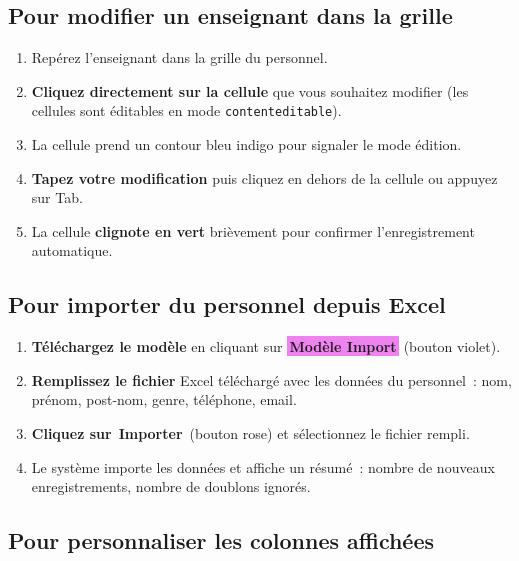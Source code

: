 \documentclass[12pt,a4paper]{report}
\newcommand{\btnviolet}[1]{{\colorbox{violet}{\small\sffamily\bfseries\color{white}\,#1\,}}}
\newcommand{\btnrose}[1]{{\colorbox{rose}{\small\sffamily\bfseries\color{white}\,#1\,}}}
\begin{document}
\subsection{Pour modifier un enseignant dans la grille}

\begin{etape}[title=Proc\'edure : Modification inline]
\begin{enumerate}[leftmargin=1.5cm,label=\textbf{\arabic*.},itemsep=8pt]
  \item Rep\'erez l'enseignant dans la grille du personnel.
  \item \textbf{Cliquez directement sur la cellule} que vous souhaitez modifier (les cellules sont \'editables en mode \texttt{contenteditable}).
  \item La cellule prend un contour bleu indigo pour signaler le mode \'edition.
  \item \textbf{Tapez votre modification} puis cliquez en dehors de la cellule ou appuyez sur Tab.
  \item La cellule \textbf{clignote en vert} bri\`evement pour confirmer l'enregistrement automatique.
\end{enumerate}
\end{etape}

\subsection{Pour importer du personnel depuis Excel}

\begin{etape}[title=Proc\'edure : Import Excel]
\begin{enumerate}[leftmargin=1.5cm,label=\textbf{\arabic*.},itemsep=10pt]
  \item \textbf{T\'el\'echargez le mod\`ele} en cliquant sur \btnviolet{Mod\`ele Import} (bouton violet).
  \item \textbf{Remplissez le fichier} Excel t\'el\'echarg\'e avec les donn\'ees du personnel~: nom, pr\'enom, post-nom, genre, t\'el\'ephone, email.
  \item \textbf{Cliquez sur} \btnrose{Importer} (bouton rose) et s\'electionnez le fichier rempli.
  \item Le syst\`eme importe les donn\'ees et affiche un r\'esum\'e~: nombre de nouveaux enregistrements, nombre de doublons ignor\'es.
\end{enumerate}
\end{etape}

\subsection{Pour personnaliser les colonnes affich\'ees}
\end{document}
